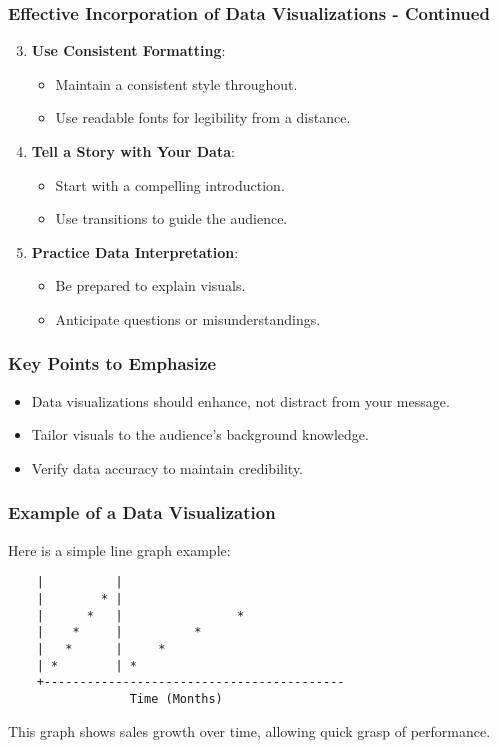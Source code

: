 \documentclass[aspectratio=169]{beamer}
\begin{document}
\begin{frame}[fragile]
    \frametitle{Effective Incorporation of Data Visualizations - Continued}
    \begin{enumerate}
        \setcounter{enumi}{2} %
        \item \textbf{Use Consistent Formatting}:
        \begin{itemize}
            \item Maintain a consistent style throughout.
            \item Use readable fonts for legibility from a distance.
        \end{itemize}
        
        \item \textbf{Tell a Story with Your Data}:
        \begin{itemize}
            \item Start with a compelling introduction.
            \item Use transitions to guide the audience.
        \end{itemize}
        
        \item \textbf{Practice Data Interpretation}:
        \begin{itemize}
            \item Be prepared to explain visuals.
            \item Anticipate questions or misunderstandings.
        \end{itemize}
    \end{enumerate}
\end{frame}

\begin{frame}[fragile]
    \frametitle{Key Points to Emphasize}
    \begin{itemize}
        \item Data visualizations should enhance, not distract from your message.
        \item Tailor visuals to the audience's background knowledge.
        \item Verify data accuracy to maintain credibility.
    \end{itemize}
\end{frame}

\begin{frame}[fragile]
    \frametitle{Example of a Data Visualization}
    Here is a simple line graph example:
    
    \begin{lstlisting}
    |          |        
    |        * |                             
    |      *   |                *            
    |    *     |          *                    
    |   *      |     *                         
    | *        | *                             
    +------------------------------------------
                 Time (Months)
    \end{lstlisting}
    
    This graph shows sales growth over time, allowing quick grasp of performance.
\end{frame}
\end{document}
